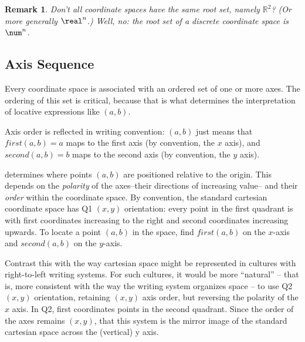 \documentclass[12pt]{tufte-handout}
\numberwithin{equation}{subsection}
\numberwithin{equation}{subsection}
\newtheorem{remark}{Remark}
\newcommand\cspace{coordinate space}
\newcommand\Rtwo{\(\mathds{R}^2\)}
\begin{document}
{  \begin{remark}
    Don't all \cspace{}s have the same root set, namely \Rtwo{}?  (Or
    more generally \(\real ^n\).)  Well, no: the root set of a
    discrete \cspace{} is \(\num ^n\).
  \end{remark}

  \subsection{Axis Sequence}
  \label{subs:orientation}

  Every \cspace{} is associated with an ordered set of one or more
  axes.  The ordering of this set is critical, because that is what
  determines the interpretation of locative expressions like
  \((a,b)\).

  Axis order is reflected in writing convention: \((a,b)\) just means
  that \(first(a,b)=a\) maps to the first axis (by convention, the $x$
  axis), and \(second(a,b)=b\) maps to the second axis (by convention,
  the $y$ axis).

  \newthought{The orientation of a \cspace{}} determines where points
  \((a,b)\) are positioned relative to the origin.  This depends on the
  \textit{polarity} of the axes--their directions of increasing value--
  and their \textit{order} within the \cspace{}.  By convention, the
  standard cartesian \cspace{} has Q1 \((x,y)\) orientation: every point in the first quadrant is
  with first coordinates increasing to the right and second
  coordinates increasing upwards.  To locate a point \((a,b)\) in the
  space, find \(first(a,b)\) on the $x$-axis and \(second(a,b)\) on
  the \(y\)-axis.

  Contrast this with the way cartesian space might be represented in
  cultures with right-to-left writing systems.  For such cultures, it
  would be more ``natural'' -- that is, more consistent with the way the
  writing system organizes space -- to use Q2 \((x,y)\) orientation,
  retaining \((x,y)\) axis order, but reversing the polarity of the
  \(x\) axis.  In Q2, first coordinates%
  points in the second quadrant.  Since the order of the axes remains
  \((x,y)\), that this system is the mirror image of the standard
  cartesian space across the (vertical) y axis.

}
\end{document}
